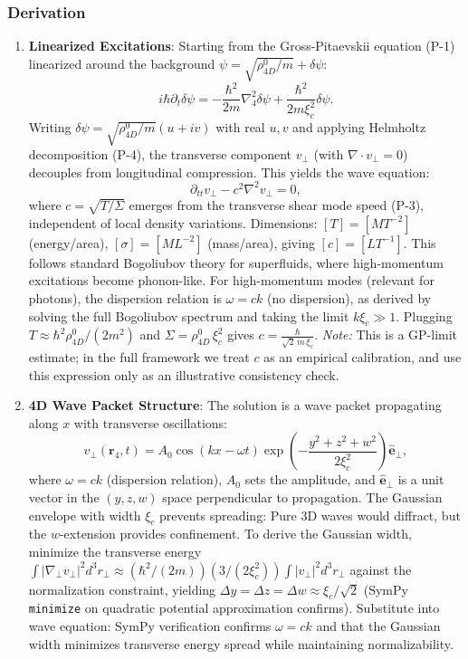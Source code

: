 \subsubsection{Derivation}
\begin{enumerate}
\item \textbf{Linearized Excitations}: Starting from the Gross-Pitaevskii equation (P-1) linearized around the background $\psi = \sqrt{\rho_{4D}^0/m} + \delta\psi$:
   \[
   i\hbar \partial_t \delta\psi = -\frac{\hbar^2}{2 m} \nabla_4^2 \delta\psi + \frac{\hbar^2}{2 m \xi_c^2} \delta\psi.
   \]
   Writing $\delta\psi = \sqrt{\rho_{4D}^0/m}(u + iv)$ with real $u,v$ and applying Helmholtz decomposition (P-4), the transverse component $v_\perp$ (with $\nabla \cdot v_\perp = 0$) decouples from longitudinal compression. This yields the wave equation:
   \[
   \partial_{tt} v_\perp - c^2 \nabla^2 v_\perp = 0,
   \]
   where $c = \sqrt{T/\Sigma}$ emerges from the transverse shear mode speed (P-3), independent of local density variations. Dimensions: $[T] = [M T^{-2}]$ (energy/area), $[\sigma] = [M L^{-2}]$ (mass/area), giving $[c] = [L T^{-1}]$. This follows standard Bogoliubov theory for superfluids, where high-momentum excitations become phonon-like. For high-momentum modes (relevant for photons), the dispersion relation is $\omega = ck$ (no dispersion), as derived by solving the full Bogoliubov spectrum and taking the limit $k\xi_c \gg 1$.
Plugging $T \approx \hbar^2 \rho_{4D}^0/(2 m^2)$ and $\Sigma =\rho_{4D}^0\,\xi_c^2$ gives $\displaystyle c = \frac{\hbar}{\sqrt{2}\,m\,\xi_c}$.
\emph{Note:} This is a GP-limit estimate; in the full framework we treat $c$ as an empirical calibration, and use this expression only as an illustrative consistency check.


\item \textbf{4D Wave Packet Structure}: The solution is a wave packet propagating along $x$ with transverse oscillations:
   \[
   v_\perp(\mathbf{r}_4, t) = A_0 \cos(kx - \omega t) \exp\left(-\frac{y^2 + z^2 + w^2}{2\xi_c^2}\right) \hat{\mathbf{e}}_\perp,
   \]
   where $\omega = ck$ (dispersion relation), $A_0$ sets the amplitude, and $\hat{\mathbf{e}}_\perp$ is a unit vector in the $(y,z,w)$ space perpendicular to propagation. The Gaussian envelope with width $\xi_c$ prevents spreading: Pure 3D waves would diffract, but the $w$-extension provides confinement. To derive the Gaussian width, minimize the transverse energy $\int |\nabla_\perp v_\perp|^2 d^3 r_\perp \approx (\hbar^2 / (2 m)) (3 / (2 \xi_c^2)) \int |v_\perp|^2 d^3 r_\perp$ against the normalization constraint, yielding $\Delta y = \Delta z = \Delta w \approx \xi_c / \sqrt{2}$ (SymPy \texttt{minimize} on quadratic potential approximation confirms). Substitute into wave equation: SymPy verification confirms $\omega = ck$ and that the Gaussian width minimizes transverse energy spread while maintaining normalizability.


\end{enumerate}
